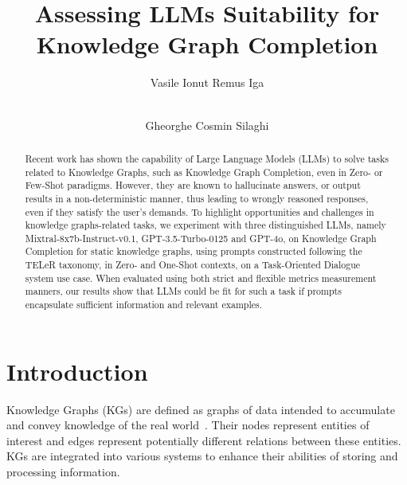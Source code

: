 \documentclass[runningheads]{llncs}
\begin{document}
%
\title{Assessing LLMs Suitability for Knowledge Graph Completion}
%
%
\author{Vasile Ionut Remus Iga \and \\
Gheorghe Cosmin Silaghi }
%
%
%
\maketitle              %
%
\begin{abstract}
Recent work has shown the capability of Large Language Models (LLMs) to solve tasks related to Knowledge Graphs, such as Knowledge Graph Completion, even in Zero- or Few-Shot paradigms. However, they are known to hallucinate answers, or output results in a non-deterministic manner, thus leading to wrongly reasoned responses, even if they satisfy the user’s demands. To highlight opportunities and challenges in knowledge graphs-related tasks, we experiment with three distinguished LLMs, namely Mixtral-8x7b-Instruct-v0.1, GPT-3.5-Turbo-0125 and GPT-4o, on Knowledge Graph Completion for static knowledge graphs, using prompts constructed following the TELeR taxonomy, in Zero- and One-Shot contexts, on a Task-Oriented Dialogue system use case. When evaluated using both strict and flexible metrics measurement manners, our results show that LLMs could be fit for such a task if prompts encapsulate sufficient information and relevant examples.
\end{abstract}
%
%
%
\section{Introduction}

Knowledge Graphs (KGs) are defined as graphs of data intended to accumulate and convey knowledge of the real world~\cite{hogan2021}. Their nodes represent entities of interest and edges represent potentially different relations between these entities.
KGs are integrated into various systems to enhance their abilities of storing and processing information.
\end{document}
